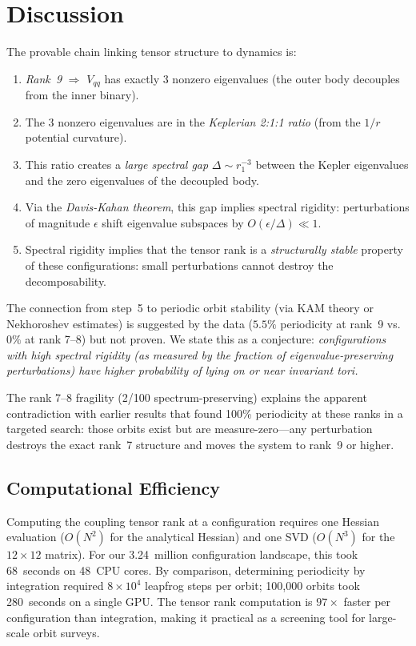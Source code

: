 \documentclass[aps,pre,twocolumn,superscriptaddress,floatfix]{revtex4-2}
\begin{document}
\section{Discussion}

The provable chain linking tensor structure to dynamics is:
\begin{enumerate}
\item \emph{Rank~9} $\Rightarrow$ $V_{qq}$ has exactly 3 nonzero eigenvalues
(the outer body decouples from the inner binary).
\item The 3 nonzero eigenvalues are in the \emph{Keplerian 2:1:1 ratio}
(from the $1/r$ potential curvature).
\item This ratio creates a \emph{large spectral gap}
$\Delta \sim r_1^{-3}$ between the Kepler eigenvalues and the zero
eigenvalues of the decoupled body.
\item Via the \emph{Davis-Kahan theorem}, this gap implies spectral
rigidity: perturbations of magnitude $\epsilon$ shift eigenvalue
subspaces by $O(\epsilon / \Delta) \ll 1$.
\item Spectral rigidity implies that the tensor rank is a
\emph{structurally stable} property of these configurations: small
perturbations cannot destroy the decomposability.
\end{enumerate}

The connection from step~5 to periodic orbit stability (via KAM theory
or Nekhoroshev estimates) is suggested by the data ($5.5\%$ periodicity
at rank~9 vs.\ $0\%$ at rank 7--8) but not proven. We state this as
a conjecture: \emph{configurations with high spectral rigidity
(as measured by the fraction of eigenvalue-preserving perturbations)
have higher probability of lying on or near invariant tori.}

The rank 7--8 fragility (2/100 spectrum-preserving) explains the
apparent contradiction with earlier results that found 100\%
periodicity at these ranks in a targeted search: those orbits exist
but are measure-zero---any perturbation destroys the exact rank~7
structure and moves the system to rank~9 or higher.

\subsection{Computational Efficiency}

Computing the coupling tensor rank at a configuration requires one
Hessian evaluation ($O(N^2)$ for the analytical Hessian) and one SVD
($O(N^3)$ for the $12 \times 12$ matrix). For our 3.24~million
configuration landscape, this took 68~seconds on 48~CPU cores.
By comparison, determining periodicity by integration required
$8 \times 10^4$ leapfrog steps per orbit; 100{,}000 orbits took
280~seconds on a single GPU. The tensor rank computation is $97\times$
faster per configuration than integration, making it practical as a
screening tool for large-scale orbit surveys.
\end{document}
